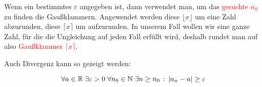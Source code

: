 \documentclass[../MAIN/main.tex]{subfiles}
\begin{document}
\begin{Bemerkung}
Wenn ein bestimmtes $\varepsilon$ angegeben ist, dann verwendet man, um das \textcolor{red}{gesuchte $n_0$} zu finden die Gaußklammern. Angewendet werden diese $\lfloor x \rfloor$ um eine Zahl abzurunden, diese $\lceil x \rceil$ um aufzurunden. In unserem Fall wollen wir eine ganze Zahl, für die die Ungleichung auf jeden Fall erfüllt wird, deshalb rundet man auf also \textcolor{red}{Gaußklammer $\lceil x \rceil$}.
\end{Bemerkung}

\begin{Bemerkung}
\begin{center}Auch Divergenz kann so gezeigt werden:\end{center}
$$\forall a \in \mathbb{R} \;\exists \varepsilon >0\; \forall n_0 \in\mathbb{N} \;\exists n\geq n_0\,:\, |a_n-a|\geq \varepsilon$$
\end{Bemerkung}
\end{document}
